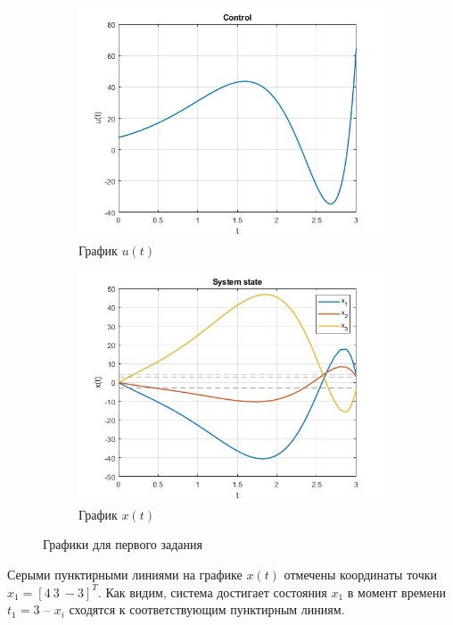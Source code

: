 \documentclass[a4paper, 12pt]{article}
\begin{document}
    \begin{figure}[H]
        \centering
        \begin{subfigure}{0.45\textwidth}
            \centering
            \includegraphics[width=\linewidth]{task_1_u_t.jpg}
            \caption{График $u(t)$}
            \label{fig:task_1_u_t}
        \end{subfigure}
        \hfill
        \begin{subfigure}{0.45\textwidth}
            \centering
            \includegraphics[width=\linewidth]{task_1_x_t.jpg}
            \caption{График $x(t)$}
            \label{fig:task_1_x_t}
        \end{subfigure}
        \caption{Графики для первого задания}
        \label{fig:task_1_modeling}
    \end{figure}
    \noindent Серыми пунктирными линиями на графике $x(t)$ отмечены координаты точки $x_1=\left[4\ 3\ -3\right]^T$.
    Как видим, система достигает состояния $x_1$ в момент времени $t_1=3$ -- $x_i$ сходятся к соответствующим пунктирным линиям.
\end{document}
